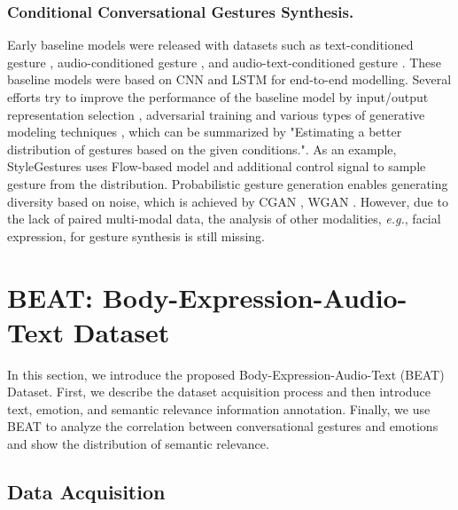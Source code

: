 \documentclass[runningheads]{llncs}
\begin{document}
\vspace{-0.5cm}

\subsubsection{Conditional Conversational Gestures Synthesis.} Early baseline models were released with datasets such as text-conditioned gesture \cite{yoon2019robots}, audio-conditioned gesture \cite{ginosar2019learning,takeuchi2017speech,ferstl2018investigating}, and audio-text-conditioned gesture \cite{yoon2020speech}. These baseline models were based on CNN and LSTM for end-to-end modelling. Several efforts try to improve the performance of the baseline model by input/output representation selection \cite{kucherenko2021moving,ferstl2021expressgesture}, adversarial training \cite{ferstl2020adversarial} and various types of generative modeling techniques \cite{wu2021probabilistic,lu2021double,wu2021modeling,ahuja2020style}, which can be summarized by "Estimating a better distribution of gestures based on the given conditions.". As an example, StyleGestures \cite{alexanderson2020style} uses Flow-based model \cite{henter2020moglow} and additional control signal to sample gesture from the distribution. Probabilistic gesture generation enables generating diversity based on noise, which is achieved by CGAN \cite{wu2021modeling}, WGAN \cite{wu2021probabilistic}. However, due to the lack of paired multi-modal data, the analysis of other modalities, \textit{e.g.}, facial expression, for gesture synthesis is still missing.  

\vspace{-0.5cm} 

\section{BEAT: Body-Expression-Audio-Text Dataset}
\label{sec:other}
In this section, we introduce the proposed Body-Expression-Audio-Text (BEAT) Dataset. First, we describe the dataset acquisition process and then introduce text, emotion, and semantic relevance information annotation. Finally, we use BEAT to analyze the correlation between conversational gestures and emotions and show the distribution of semantic relevance.

\subsection{Data Acquisition}
\end{document}
